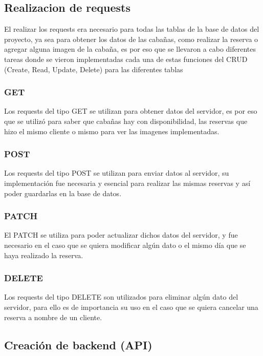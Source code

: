 \subsection{Realizacion de requests}

El realizar los requests era necesario para todas las tablas de la base de datos del proyecto, ya sea para obtener los datos de las cabañas, como realizar la reserva o agregar alguna imagen de la cabaña, es por eso que se llevaron a cabo diferentes tareas donde se vieron implementadas cada una de estas funciones del CRUD (Create, Read, Update, Delete) para las diferentes tablas

\subsubsection{GET}

Los requests del tipo GET se utilizan para obtener datos del servidor, es por eso que se utilizó para saber que cabañas hay con disponibilidad, las reservas que hizo el mismo cliente o mismo para ver las imagenes implementadas.

\subsubsection{POST}

Los requests del tipo POST se utilizan para enviar datos al servidor, su implementación fue necesaria y esencial para realizar las mismas reservas y así poder guardarlas en la base de datos.

\subsubsection{PATCH}

El PATCH se utiliza para poder actualizar dichos datos del servidor, y fue necesario en el caso que se quiera modificar algún dato o el mismo día que se haya realizado la reserva.

\subsubsection{DELETE}

Los requests del tipo DELETE son utilizados para eliminar algún dato del servidor, para ello es de importancia su uso en el caso que se quiera cancelar una reserva a nombre de un cliente.

\subsection{Creación de backend (API)}

